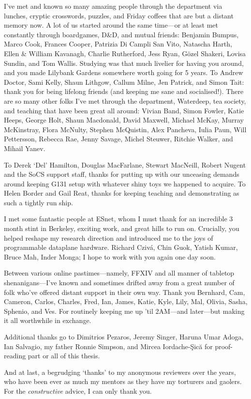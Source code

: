 I've met and known so many amazing people through the department via lunches, cryptic crosswords, puzzles, and Friday coffees that are but a distant memory now.
A lot of us started around the same time---or at least met constantly through boardgames, D\&D, and mutual friends: Benjamin Bumpus, Marco Cook, Frances Cooper, Patrizia Di Campli San Vito, Natascha Harth, Ellen \& William Kavanagh, Charlie Rutherford, Jess Ryan, G\"{o}zel Shakeri, Lovisa Sundin, and Tom Wallis.
Studying was that much livelier for having you around, and you made Lilybank Gardens somewhere worth going for 5 years.
To Andrew Doctor, Sami Kelly, Shaun Lithgow, Callum Milne, Jen Patrick, and Simon Tait: thank you for being lifelong friends (and keeping me sane and socialised!).
There are so many other folks I've met through the department, Waterdeep, tea society, and teaching that have been great all around: Vivian Band, Simon Fowler, Katie Heeps, George Holt, Shaun Macdonald, David Maxwell, Michael McKay, Murray McKinstray, Flora McNulty, Stephen McQuistin, Alex Pancheva, Iulia Paun, Will Pettersson, Rebecca Rae, Jenny Savage, Michel Steuwer, Ritchie Walker, and Mihail Yanev.

To Derek `Del' Hamilton, Douglas MacFarlane, Stewart MacNeill, Robert Nugent and the SoCS support staff, thanks for putting up with our unceasing demands around keeping G131 setup with whatever shiny toys we happened to acquire.
To Helen Border and Gail Reat, thanks for keeping teaching and demonstrating as such a tightly run ship.

I met some fantastic people at ESnet, whom I must thank for an incredible 3 month stint in Berkeley, exciting work, and great hills to run on.
Crucially, you helped reshape my research direction and introduced me to the joys of programmable dataplane hardware.
Richard Cziv\'{a}, Chin Guok, Yatish Kumar, Bruce Mah, Inder Monga; I hope to work with you again one day soon.

Between various online pastimes---namely, FFXIV and all manner of tabletop shenanigans---I've known and sometimes drifted away from a great number of folk who've offered distant support in their own way.
Thank you Bernhard, Cam, Cameron, Carlos, Charles, Fred, Ian, James, Katie, Kyle, Lily, Mal, Olivia, Sasha, Sphenio, and Ves.
For routinely keeping me up 'til 2AM---and later---but making it all worthwhile in exchange.

Additional thanks go to Dimitrios Pezaros, Jeremy Singer, Haruna Umar Adoga, Ian Salvagio, my father Ronnie Simpson, and Mircea Iordache-\c{S}ic\u{a} for proof-reading part or all of this thesis.

And at last, a begrudging `thanks' to my anonymous reviewers over the years, who have been ever as much my mentors as they have my torturers and gaolers.
For the \emph{constructive} advice, I can only thank you.
